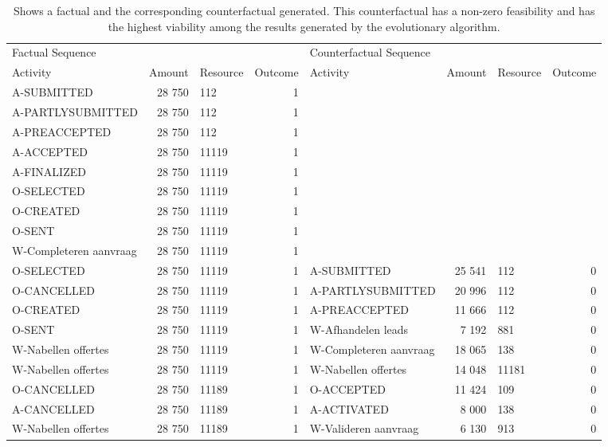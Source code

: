 \begin{table}
\caption{Shows a factual and the corresponding counterfactual generated. This counterfactual has a non-zero feasibility and has the highest viability among the results generated by the evolutionary algorithm.}
\label{tbl:example-cf-evo-feasibility}
\begin{tabular}{lrlrlrlr}
\toprule
\multicolumn{4}{l}{Factual Sequence} & \multicolumn{4}{l}{Counterfactual Sequence} \\
Activity & Amount & Resource & Outcome & Activity & Amount & Resource & Outcome \\
\midrule
A-SUBMITTED & 28 750 & 112 & 1 &  &  &  &  \\
A-PARTLYSUBMITTED & 28 750 & 112 & 1 &  &  &  &  \\
A-PREACCEPTED & 28 750 & 112 & 1 &  &  &  &  \\
A-ACCEPTED & 28 750 & 11119 & 1 &  &  &  &  \\
A-FINALIZED & 28 750 & 11119 & 1 &  &  &  &  \\
O-SELECTED & 28 750 & 11119 & 1 &  &  &  &  \\
O-CREATED & 28 750 & 11119 & 1 &  &  &  &  \\
O-SENT & 28 750 & 11119 & 1 &  &  &  &  \\
W-Completeren aanvraag & 28 750 & 11119 & 1 &  &  &  &  \\
O-SELECTED & 28 750 & 11119 & 1 & A-SUBMITTED & 25 541 & 112 & 0 \\
O-CANCELLED & 28 750 & 11119 & 1 & A-PARTLYSUBMITTED & 20 996 & 112 & 0 \\
O-CREATED & 28 750 & 11119 & 1 & A-PREACCEPTED & 11 666 & 112 & 0 \\
O-SENT & 28 750 & 11119 & 1 & W-Afhandelen leads & 7 192 & 881 & 0 \\
W-Nabellen offertes & 28 750 & 11119 & 1 & W-Completeren aanvraag & 18 065 & 138 & 0 \\
W-Nabellen offertes & 28 750 & 11119 & 1 & W-Nabellen offertes & 14 048 & 11181 & 0 \\
O-CANCELLED & 28 750 & 11189 & 1 & O-ACCEPTED & 11 424 & 109 & 0 \\
A-CANCELLED & 28 750 & 11189 & 1 & A-ACTIVATED & 8 000 & 138 & 0 \\
W-Nabellen offertes & 28 750 & 11189 & 1 & W-Valideren aanvraag & 6 130 & 913 & 0 \\
\bottomrule
\end{tabular}
\end{table}
